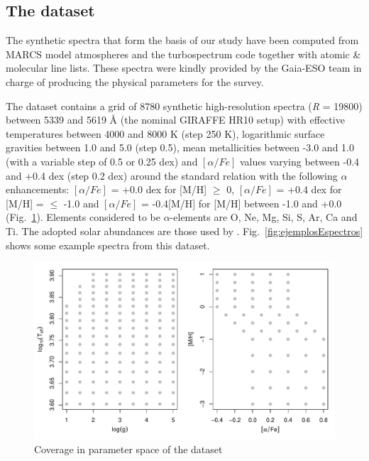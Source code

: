 \documentclass[a4paper,fleqn,usenatbib]{mnras}
\begin{document}
{{{\subsection{The dataset}

The synthetic spectra that form the basis of our study have been
computed from MARCS model atmospheres \citep{gustafsson:08} and the
turbospectrum code \citep{alvarez:98, plez:12} together with atomic \&
molecular line lists. These spectra were kindly provided by the
Gaia-ESO team in charge of producing the physical parameters for the
survey.

The dataset contains a grid of 8780 synthetic high-resolution spectra
(\textit{R} = 19800) between 5339 and 5619 {\AA} (the nominal GIRAFFE
HR10 setup) with effective temperatures between 4000 and 8000 K (step
250 K), logarithmic surface gravities between 1.0 and 5.0 (step 0.5),
mean metallicities between -3.0 and 1.0 (with a variable step of 0.5
or 0.25 dex) and $\left[ \alpha/Fe \right]$ values varying between
-0.4 and +0.4 dex (step 0.2 dex) around the standard relation with the
following $\alpha$ enhancements: $\left[ \alpha/Fe \right]$ = +0.0 dex
for [M/H] $\geqslant$ 0, $\left[ \alpha/Fe \right]$ = +0.4 dex for
[M/H] = $\leqslant$ -1.0 and $\left[ \alpha/Fe \right]$ = -0.4[M/H]
for [M/H] between -1.0 and +0.0 (Fig.~\ref{fig:gridModelos}).
Elements considered to be $\alpha$-elements are O, Ne, Mg, Si, S, Ar,
Ca and Ti. The adopted solar abundances are those used by
\citep{gustafsson:08}.  Fig.~\ref{fig:ejemplosEspectros} shows some
example spectra from this dataset.

\begin{figure}
\centering\includegraphics[width=\columnwidth]{grid_modelos.pdf}
\caption{Coverage in parameter space of the dataset}
\label{fig:gridModelos}
\end{figure}

}}}
\end{document}
